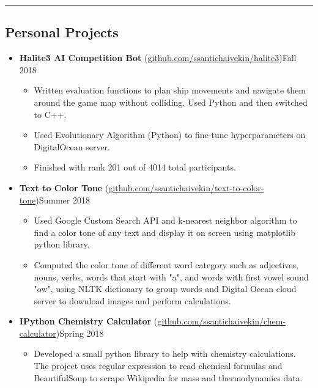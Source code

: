 \documentclass[10.5pt,letterpaper]{article}
\begin{document}
\hrule
\vspace{-0.95em}
\subsection*{Personal Projects}
  \begin{itemize}
    \parskip=-0.45em
    \item[]
    {\textbf{Halite3 AI Competition Bot} (\href{https://github.com/ssantichaivekin/halite3}
    {github.com/ssantichaivekin/halite3})\hfill {Fall 2018}}
    \begin{itemize}[label=\textbullet]
        \item  Written evaluation functions to plan ship movements and navigate them around the game map without colliding.
        Used Python and then switched to C++.
        \item Used Evolutionary Algorithm (Python) to fine-tune hyperparameters on DigitalOcean server.
        \item Finished with rank 201 out of 4014 total participants.
    \end{itemize}
    \vspace{0.1em}
    \item[]
    {\textbf{Text to Color Tone} (\href{https://github.com/ssantichaivekin/text-to-color-tone}
    {github.com/ssantichaivekin/text-to-color-tone})\hfill {Summer 2018}}
    \begin{itemize}[label=\textbullet]
        \item  Used Google Custom Search API and k-nearest neighbor algorithm to find a color tone 
        of any text and display it on screen using matplotlib python library.
        \item  Computed the color tone of different word category such as adjectives, nouns, verbs, 
        words that start with "a", and words with first vowel sound "ow", using NLTK dictionary to 
        group words and Digital Ocean cloud server to download images and perform calculations.
    \end{itemize}
    \vspace{0.1em}
    \item[]
    {\textbf{IPython Chemistry Calculator} (\href{https://github.com/ssantichaivekin/chem-calculator}
    {github.com/ssantichaivekin/chem-calculator})\hfill {Spring 2018}}
    \begin{itemize}[label=\textbullet]
        \item  Developed a small python library to help with chemistry calculations. 
        The project uses regular expression to read chemical formulas and BeautifulSoup to scrape 
        Wikipedia for mass and thermodynamics data.
    \end{itemize}
  \end{itemize}
\end{document}
